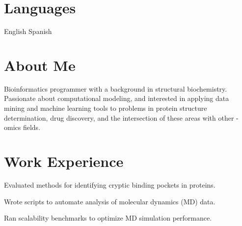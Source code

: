 \documentclass[]{deedy-resume-openfont}
\begin{document}
\begin{minipage}[t]{0.33\textwidth}

\section{Languages}
 \textbullet{}   English \textbullet{} Spanish \\


\end{minipage} 
\hfill
\begin{minipage}[t]{0.66\textwidth} 


\section{About Me}

Bioinformatics programmer with a background in structural biochemistry. Passionate about
computational modeling, and interested in applying data mining and machine learning tools to problems in protein structure determination, drug discovery, and the intersection of these areas with other -omics fields.

\sectionsep


\section{Work Experience}
\sectionsep
\begin{tightemize}
\item Evaluated methods for identifying cryptic binding pockets in proteins.\item Wrote scripts to automate analysis of molecular dynamics (MD) data. \item Ran scalability benchmarks to optimize MD simulation performance.  \end{tightemize}
\sectionsep


\end{minipage}
\end{document}
